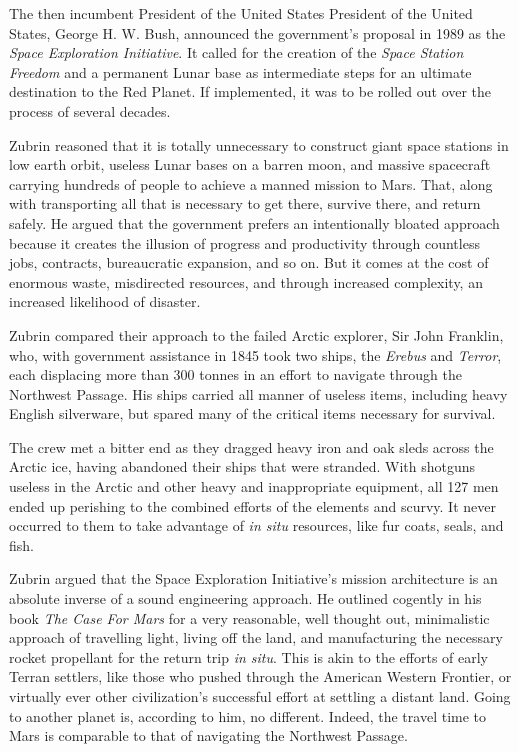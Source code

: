 The then incumbent President of the United States President of the United States, George H. W. Bush, announced the government's proposal in 1989 as the {\it Space Exploration Initiative}. It called for the creation of the {\it Space Station Freedom} and a permanent Lunar base as intermediate steps for an ultimate destination to the Red Planet. If implemented, it was to be rolled out over the process of several decades.

Zubrin reasoned that it is totally unnecessary to construct giant space stations in low earth orbit, useless Lunar bases on a barren moon, and massive spacecraft carrying hundreds of people to achieve a manned mission to Mars. That, along with transporting all that is necessary to get there, survive there, and return safely. He argued that the government prefers an intentionally bloated approach because it creates the illusion of progress and productivity through countless jobs, contracts, bureaucratic expansion, and so on. But it comes at the cost of enormous waste, misdirected resources, and through increased complexity, an increased likelihood of disaster.

Zubrin compared their approach to the failed Arctic explorer, Sir John Franklin, who, with government assistance in 1845 took two ships, the {\it Erebus} and {\it Terror}, each displacing more than 300 tonnes in an effort to navigate through the Northwest Passage. His ships carried all manner of useless items, including heavy English silverware, but spared many of the critical items necessary for survival. 

The crew met a bitter end as they dragged heavy iron and oak sleds across the Arctic ice, having abandoned their ships that were stranded. With shotguns useless in the Arctic and other heavy and inappropriate equipment, all 127 men ended up perishing to the combined efforts of the elements and scurvy. It never occurred to them to take advantage of {\it in situ} resources, like fur coats, seals, and fish.

Zubrin argued that the Space Exploration Initiative's mission architecture is an absolute inverse of a sound engineering approach. He outlined cogently in his book {\it The Case For Mars} for a very reasonable, well thought out, minimalistic approach of travelling light, living off the land, and manufacturing the necessary rocket propellant for the return trip {\it in situ}. This is akin to the efforts of early Terran settlers, like those who pushed through the American Western Frontier, or virtually ever other civilization's successful effort at settling a distant land. Going to another planet is, according to him, no different. Indeed, the travel time to Mars is comparable to that of navigating the Northwest Passage.

